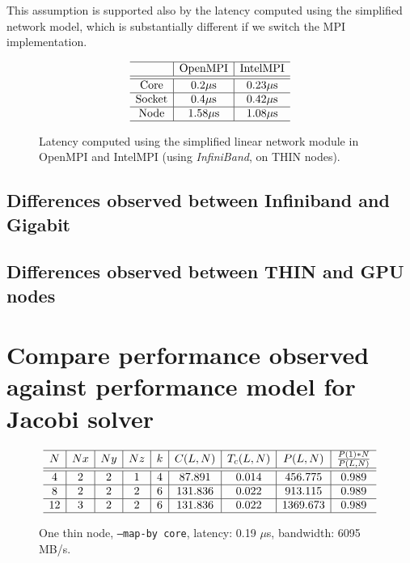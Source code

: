 \documentclass{article}
\begin{document}
This assumption is supported also by the latency computed using the simplified network model, which is substantially different if we switch the MPI implementation.

\begin{figure}[h]
    $$
        \begin{array}{c | c | c} \hline
            & \text{OpenMPI} & \text{IntelMPI} \\ \hline
            \hline
            \text{Core} & 0.2 \mu \text{s}  & 0.23 \mu \text{s} \\ \hline
            \text{Socket} & 0.4 \mu \text{s}  & 0.42 \mu \text{s} \\ \hline
            \text{Node} & 1.58 \mu \text{s}  & 1.08 \mu \text{s} \\ \hline
        \end{array}
    $$
    \caption{Latency computed using the simplified linear network module in OpenMPI and IntelMPI (using \emph{InfiniBand}, on THIN nodes).}
\end{figure}

\subsection{Differences observed between Infiniband and Gigabit}

\subsection{Differences observed between THIN and GPU nodes}

\section{Compare performance observed against performance model for Jacobi solver}



\begin{figure}
    $$
        \begin{array}{c | c | c | c | c | c | c | c | c} \hline
            N  & Nx & Ny & Nz & k & C(L,N)  & T_c(L,N) &     P(L,N)     & \frac{P(1)*N}{P(L,N)} \\ \hline
            \hline
            4  & 2  & 2  & 1  & 4 & 87.891  &  0.014   & 456.775  &         0.989         \\ \hline
            8  & 2  & 2  & 2  & 6 & 131.836 &  0.022   & 913.115  &         0.989         \\ \hline
            12 & 3  & 2  & 2  & 6 & 131.836 &  0.022   & 1369.673 &         0.989         \\ \hline
        \end{array}
    $$
    \caption{One thin node, \texttt{--map-by core}, latency: 0.19 $\mu$s, bandwidth: 6095 MB/s.}
\end{figure}
\end{document}
